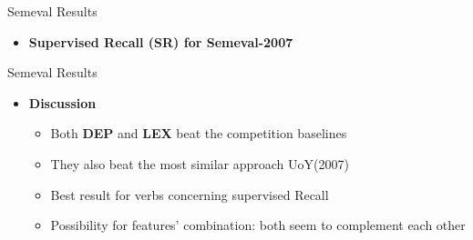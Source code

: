 \documentclass[10pt,xcolor=table]{beamer}
\begin{document}
\begin{frame}{Semeval Results}
\begin{itemize}
	\item[] \textbf{Supervised Recall (SR) for Semeval-2007}
			 	\centering	           
\end{itemize}
\end{frame}




\begin{frame}{Semeval Results}



\begin{itemize}
\item\textbf{Discussion}
\begin{itemize}
\item Both  \textbf{DEP} and \textbf{LEX} beat the competition baselines
\item They also beat the most similar approach UoY(2007)
\item Best result for verbs concerning supervised Recall 
\item Possibility for features' combination: both seem to complement each other

\end{itemize}
%
%
%
%
%

\end{itemize}

\end{frame}
\end{document}
